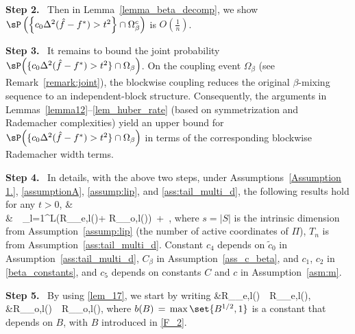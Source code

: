 \documentclass[twoside,11pt]{article}
\newcommand{\step}[1]{\par\medskip\noindent\textbf{#1.}\ }
\begin{document}
\step{Step 2}
Then in Lemma~\ref{lemma_beta_decomp}, we show $\sP\left(\left\{ c_0\Delta^2(\hat f - f^*) > t^2\right\} \cap \Omega_{\beta}^{c}\right)$ is $O(\frac{1}{n})$.


\step{Step 3} 
It remains to bound the joint probability
$\sP\!\left(\{c_0\Delta^2(\hat f-f^*)>t^2\}\cap \Omega_\beta\right)$.
On the coupling event $\Omega_\beta$ (see Remark~\ref{remark:joint}),
the blockwise coupling reduces the original $\beta$-mixing sequence to an
independent-block structure. Consequently, the arguments in
Lemmas~\ref{lemma12}--\ref{lem_huber_rate} (based on symmetrization and
Rademacher complexities) yield an upper bound for
$\sP\!\left(\{c_0\Delta^2(\hat f-f^*)>t^2\}\cap \Omega_\beta\right)$
in terms of the corresponding blockwise Rademacher width terms. 
\step{Step 4} 
In details, with the above two steps, under Assumptions~\ref{Assumption 1.}, \ref{assumptionA}, \ref{assump:lip}, and \ref{ass:tail_multi_d}, the following results hold for any $t > 0$, 
\bea
&\sP{}  
\\ & \,\leq\, \sum_{l=1}^L\Big(R_{_{e,l}}(\gF \cap {})+ R_{_{o,l}}(\gF \cap {})\Big) \,+\, , 
\bea  where $s = |S|$ is the intrinsic dimension from Assumption~\ref{assump:lip} (the number of active coordinates of $\Pi$), $T_n$ is from Assumption~\ref{ass:tail_multi_d}. Constant $c_{4}$ depends on $\tilde c_0$ in Assumption~\ref{ass:tail_multi_d}, $C_{\beta}$ in Assumption~\ref{ass_c_beta}, and $c_1$, $c_2$ in \eqref{beta_constants}, and $c_5$ depends on constants $C$ and $c$ in Assumption~\ref{asm:m}.

\step{Step 5}
By using \cref{lem_17},  we start by writing
\bea 
&R_{_{e,l}}\left(\gF\cap {}\right) \,\leq\, R_{_{e,l}}\left(\gF\cap {}\right), \,\,\,\,\,\, \\
&R_{_{o,l}}\left(\gF\cap {}\right) \,\leq\, R_{_{o,l}}\left(\gF\cap {}\right),
\bea 
where $b(B) \,=\, \max\set{B^{1/2},1}$ is a constant that depends on $B$, with $B$ introduced in \eqref{F_2}. 
\end{document}
